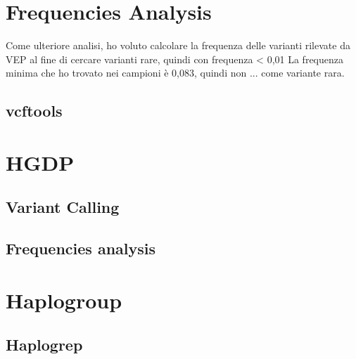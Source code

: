 \section{Frequencies Analysis}
Come ulteriore analisi, ho voluto calcolare la frequenza delle varianti rilevate da VEP al fine di cercare varianti rare, quindi con frequenza < 0,01
La frequenza minima che ho trovato nei campioni è 0,083, quindi non ... come variante rara.

\subsection{vcftools}
\section{HGDP}
\subsection{Variant Calling}
\subsection{Frequencies analysis}
\section{Haplogroup}

\subsection{Haplogrep}
